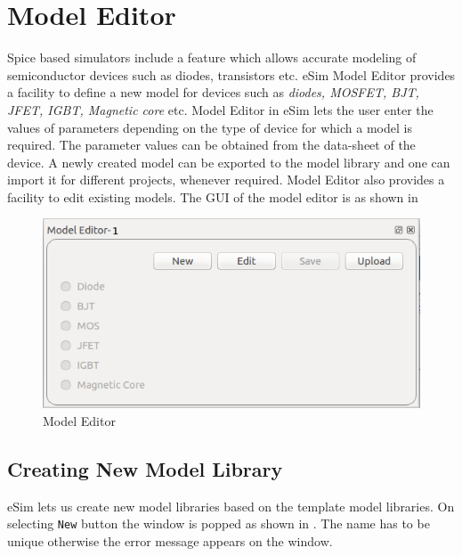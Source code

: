 \chapter {Model Editor}
\label{chap7}
\thispagestyle{empty}

Spice based simulators include a feature which allows accurate modeling
of semiconductor devices such as diodes, transistors etc. eSim Model
Editor provides a facility to define a new model for devices such as
\textit{diodes, MOSFET, BJT, JFET, IGBT, Magnetic core} etc. Model Editor in
eSim lets the user enter the values of parameters depending on the type of 
device for which a model is required. The parameter values can be
obtained from the data-sheet of the device. A newly created model can be
exported to the model library and one can import it for different
projects, whenever required. Model Editor also provides a facility to
edit existing models. The GUI of the model editor is as shown in 

\begin{figure}
\centering
\includegraphics[width =\lgfig]{modeleditor_new.png}
\caption{Model Editor}
\label{modeleditor}
\end{figure} 

\section{Creating New Model Library }

eSim lets us create new model libraries based on the template model libraries.
On selecting {\tt New} button the window is popped as shown in . The name has to be unique otherwise the error message appears on the window.

